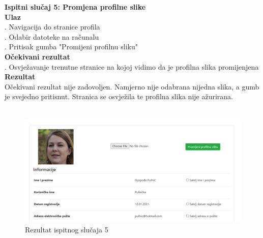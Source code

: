 {			\noindent \textbf{Ispitni slučaj 5: Promjena profilne slike}
			\\
			\textbf{Ulaz}
			\\
			. Navigacija do stranice profila \\
			. Odabir datoteke na računalu \\
			. Pritisak gumba "Promijeni profilnu sliku" \\
			\textbf{Očekivani rezultat}
			\\
			. Osvježavanje trenutne stranice na kojoj vidimo da je profilna slika promijenjena \\
			\textbf{Rezultat}
			\\
			\indent Očekivani rezultat nije zadovoljen. Namjerno nije odabrana nijedna slika, a gumb je svejedno pritisnut. Stranica se osvježila te profilna slika nije ažurirana.
			\\ \\
			\begin{figure}[H]
				\centering
				\includegraphics[scale=0.34]{"slike/test5"}
				\caption{Rezultat ispitnog slučaja 5}
				\label{fig:rezultat-ispitnog-slucaja-5}
			\end{figure}
			
}
